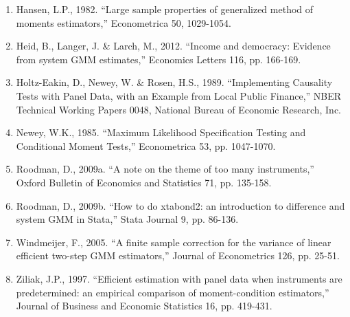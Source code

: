 \begin{enumerate}
\item Hansen, L.P., 1982. ``Large sample properties of generalized method of moments estimators,'' Econometrica 50, 1029-1054.

\item Heid, B., Langer, J. \& Larch, M., 2012. ``Income and democracy: Evidence from system GMM estimates,'' Economics Letters 116, pp. 166-169.

\item Holtz-Eakin, D., Newey, W. \& Rosen, H.S., 1989.
``Implementing Causality Tests with Panel Data, with an Example from Local Public Finance,'' NBER Technical Working Papers 0048, National Bureau of Economic Research, Inc.


\item Newey, W.K., 1985. ``Maximum Likelihood Specification Testing and Conditional Moment Tests,'' Econometrica 53, pp. 1047-1070.



\item Roodman, D., 2009a. ``A note on the theme of too many instruments,'' Oxford Bulletin of Economics and Statistics 71, pp. 135-158.

 \item Roodman, D., 2009b. ``How to do xtabond2: an introduction to difference and system GMM in Stata,'' Stata Journal 9, pp. 86-136.



\item Windmeijer, F., 2005. ``A finite sample correction for the variance of linear efficient two-step GMM estimators,'' Journal of Econometrics 126, pp. 25-51.

\item  Ziliak, J.P., 1997. ``Efficient estimation with panel data when instruments are predetermined: an empirical comparison of moment-condition estimators,'' Journal of Business and Economic Statistics 16, pp. 419-431.

\end{enumerate}